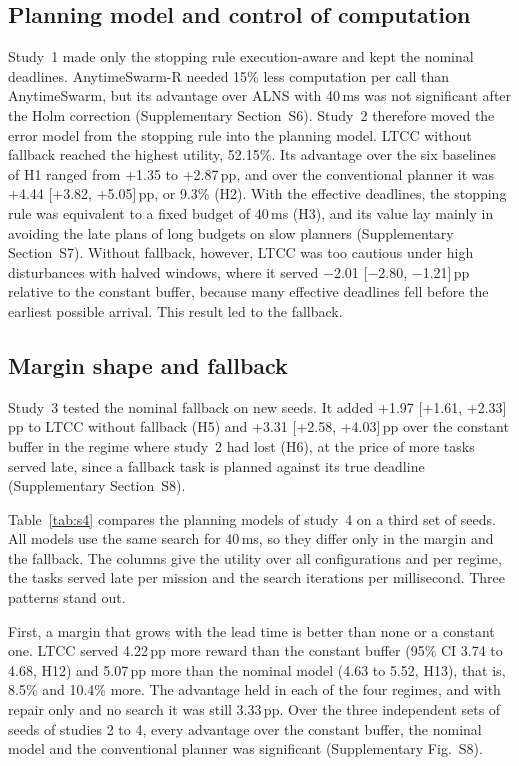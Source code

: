 \documentclass[a4paper,fleqn]{cas-dc}
\newcommand{\mname}{LTCC}  %
\newcounter{prop}
\begin{document}
\subsection{Planning model and control of computation}\label{sec:study1}\label{sec:study2}
Study~1 made only the stopping rule execution-aware and kept the nominal deadlines. AnytimeSwarm-R needed
15\% less computation per call than AnytimeSwarm, but its advantage over ALNS with 40\,ms was not
significant after the Holm correction (Supplementary Section~S6). Study~2 therefore moved the error
model from the stopping rule into the planning model. \mname{} without fallback reached the highest utility,
52.15\%. Its advantage over the six baselines of H1 ranged from +1.35 to +2.87\,pp, and over the
conventional planner it was +4.44 [+3.82, +5.05]\,pp, or 9.3\% (H2). With the effective deadlines, the stopping
rule was equivalent to a fixed budget of 40\,ms (H3), and its value lay mainly in avoiding the late plans of long
budgets on slow planners (Supplementary Section~S7). Without fallback, however, \mname{} was too
cautious under high disturbances with halved windows, where it served $-$2.01 [$-$2.80, $-$1.21]\,pp relative to the constant
buffer, because many effective deadlines fell before the earliest possible arrival. This result led to the fallback.

\subsection{Margin shape and fallback}\label{sec:study3}\label{sec:study4}
Study~3 tested the nominal fallback on new seeds. It added +1.97 [+1.61, +2.33]\,pp to \mname{} without fallback (H5) and
+3.31 [+2.58, +4.03]\,pp over the constant buffer in the regime where study~2 had lost (H6), at the price of more tasks
served late, since a fallback task is planned against its true deadline (Supplementary Section~S8).

Table~\ref{tab:s4} compares the planning models of study~4 on a third set of seeds. All models use the same search for
40\,ms, so they differ only in the margin and the fallback. The columns give the utility over all configurations and
per regime, the tasks served late per mission and the search iterations per millisecond. Three patterns stand out.

First, a margin that grows with the lead time is better than none or a constant one. \mname{} served
4.22\,pp more reward than the constant buffer (95\% CI 3.74 to 4.68, H12) and 5.07\,pp
more than the nominal model (4.63 to 5.52, H13), that is, 8.5\% and 10.4\% more. The
advantage held in each of the four regimes, and with repair only and no search it was still 3.33\,pp.
Over the three independent sets of seeds of studies 2 to 4, every advantage over the constant buffer, the nominal model
and the conventional planner was significant (Supplementary Fig.~S8).
\end{document}

